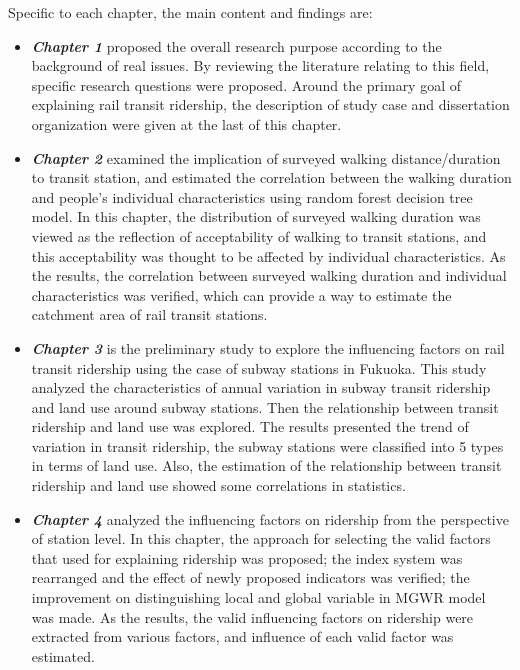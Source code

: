 Specific to each chapter, the main content and findings are:
\begin{itemize}
	\item \emph{\textbf{Chapter 1}} proposed the overall research purpose according to the background of real issues. By reviewing the literature relating to this field, specific research questions were proposed. Around the primary goal of explaining rail transit ridership, the description of study case and dissertation organization were given at the last of this chapter.
	
	\item \emph{\textbf{Chapter 2}} examined the implication of surveyed walking distance/duration to transit station, and estimated the correlation between the walking duration and people's individual characteristics using random forest decision tree model. In this chapter, the distribution of surveyed walking duration was viewed as the reflection of acceptability of walking to transit stations, and this acceptability was thought to be affected by individual characteristics. As the results, the correlation between surveyed walking duration and individual characteristics was verified, which can provide a way to estimate the catchment area of rail transit stations.
	
	\item \emph{\textbf{Chapter 3}} is the preliminary study to explore the influencing factors on rail transit ridership using the case of subway stations in Fukuoka. This study analyzed the characteristics of annual variation in subway transit ridership and land use around subway stations. Then the relationship between transit ridership and land use was explored. The results presented the trend of variation in transit ridership, the subway stations were classified into 5 types in terms of land use. Also, the estimation of the relationship between transit ridership and land use showed some correlations in statistics.
	
	\item \emph{\textbf{Chapter 4}} analyzed the influencing factors on ridership from the perspective of station level. In this chapter, the approach for selecting the valid factors that used for explaining ridership was proposed; the index system was rearranged and the effect of newly proposed indicators was verified; the improvement on distinguishing local and global variable in MGWR model was made. As the results, the valid influencing factors on ridership were extracted from various factors, and influence of each valid factor was estimated.
	

\end{itemize}

